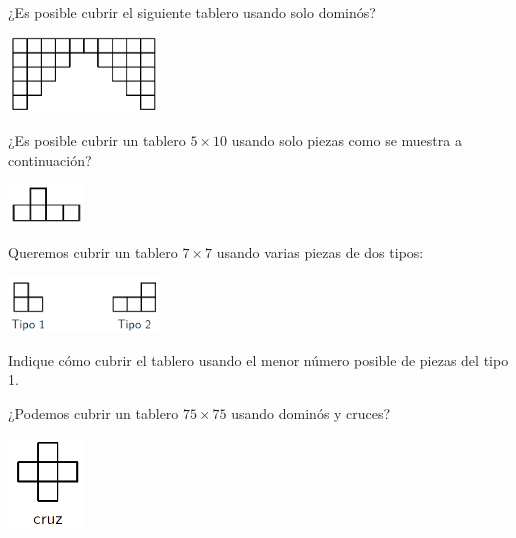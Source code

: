 \documentclass[11pt]{scrartcl}
\begin{document}
\begin{problem}
¿Es posible cubrir el siguiente tablero usando solo dominós?
\begin{center}
    \includegraphics[width=4cm]{images/clase_09_problema_dominos.png}
\end{center}
\end{problem}

\begin{problem}
¿Es posible cubrir un tablero $5 \times 10$ usando solo piezas como se muestra a continuación?
\begin{center}
    \includegraphics[width=2cm]{images/clase_09_problema_quintimino.png}
\end{center}
\end{problem}

\begin{problem}
 Queremos cubrir un tablero $7 \times 7$ usando varias piezas de dos tipos:
\begin{center}
    \includegraphics[width=4cm]{images/clase_combi_centro_09_L_trimino_y_L.png}
\end{center}
Indique cómo cubrir el tablero usando el menor número posible de piezas del tipo 1.
\end{problem}

\begin{problem}[Rusia 1997]¿Podemos cubrir un tablero $75 \times 75$ usando dominós y cruces?
\begin{center}
    \includegraphics[width=2cm]{images/clase_09_cruz.png}
\end{center}
\end{problem}
\end{document}
